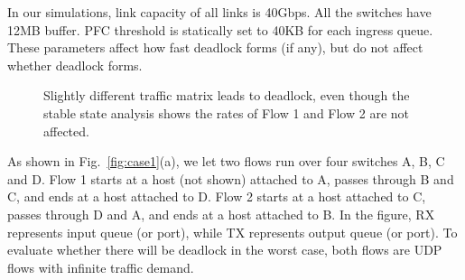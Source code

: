  In our simulations, link capacity of all links is 40Gbps. All the switches have 12MB buffer. 
 PFC threshold is statically set to 40KB for each ingress queue. These parameters affect
 how fast deadlock forms (if any), but do not affect whether deadlock forms.


\begin{figure}[t]
\centering

\caption{Slightly different traffic matrix leads to deadlock, even though
the stable state analysis shows the rates of Flow 1 and Flow 2 are not affected.}
\label{fig:case2}
\end{figure}

As shown in Fig.~\ref{fig:case1}(a), we let two flows run over four 
switches A, B, C and D. Flow 1 starts at a host (not shown) attached to A, passes through B and C, 
and ends at a host attached to D. Flow 2 starts at a host attached to C, passes through D and A, 
and ends at a host attached to B. In the figure, RX represents input queue (or port), while TX 
represents output queue (or port). To evaluate whether there will be deadlock in the worst case, 
both flows are UDP flows with infinite traffic demand.


